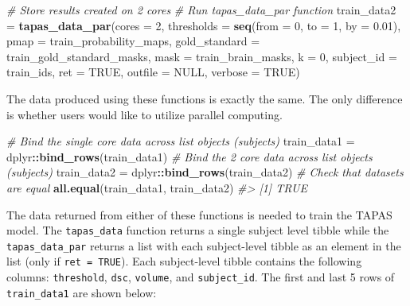 \documentclass[]{article}
\newenvironment{Shaded}{\begin{snugshade}}{\end{snugshade}}
\newcommand{\CommentTok}[1]{\textcolor[rgb]{0.56,0.35,0.01}{\textit{#1}}}
\newcommand{\DataTypeTok}[1]{\textcolor[rgb]{0.13,0.29,0.53}{#1}}
\newcommand{\DecValTok}[1]{\textcolor[rgb]{0.00,0.00,0.81}{#1}}
\newcommand{\FloatTok}[1]{\textcolor[rgb]{0.00,0.00,0.81}{#1}}
\newcommand{\KeywordTok}[1]{\textcolor[rgb]{0.13,0.29,0.53}{\textbf{#1}}}
\newcommand{\NormalTok}[1]{#1}
\newcommand{\OperatorTok}[1]{\textcolor[rgb]{0.81,0.36,0.00}{\textbf{#1}}}
\newcommand{\OtherTok}[1]{\textcolor[rgb]{0.56,0.35,0.01}{#1}}
\newcommand{\StringTok}[1]{\textcolor[rgb]{0.31,0.60,0.02}{#1}}
\begin{document}
\begin{Shaded}
\begin{Highlighting}[]
\CommentTok{# Store results created on 2 cores}
\CommentTok{# Run tapas_data_par function}
\NormalTok{train_data2 =}\StringTok{ }\KeywordTok{tapas_data_par}\NormalTok{(}\DataTypeTok{cores =} \DecValTok{2}\NormalTok{, }
                             \DataTypeTok{thresholds =} \KeywordTok{seq}\NormalTok{(}\DataTypeTok{from =} \DecValTok{0}\NormalTok{, }\DataTypeTok{to =} \DecValTok{1}\NormalTok{, }\DataTypeTok{by =} \FloatTok{0.01}\NormalTok{), }
                             \DataTypeTok{pmap =}\NormalTok{ train_probability_maps, }
                             \DataTypeTok{gold_standard =}\NormalTok{ train_gold_standard_masks, }
                             \DataTypeTok{mask =}\NormalTok{ train_brain_masks, }
                             \DataTypeTok{k =} \DecValTok{0}\NormalTok{, }
                             \DataTypeTok{subject_id =}\NormalTok{ train_ids,}
                             \DataTypeTok{ret =} \OtherTok{TRUE}\NormalTok{, }
                             \DataTypeTok{outfile =} \OtherTok{NULL}\NormalTok{, }
                             \DataTypeTok{verbose =} \OtherTok{TRUE}\NormalTok{)}
\end{Highlighting}
\end{Shaded}

The data produced using these functions is exactly the same. The only
difference is whether users would like to utilize parallel computing.

\begin{Shaded}
\begin{Highlighting}[]
\CommentTok{# Bind the single core data across list objects (subjects)}
\NormalTok{train_data1 =}\StringTok{ }\NormalTok{dplyr}\OperatorTok{::}\KeywordTok{bind_rows}\NormalTok{(train_data1)}
\CommentTok{# Bind the 2 core data across list objects (subjects)}
\NormalTok{train_data2 =}\StringTok{ }\NormalTok{dplyr}\OperatorTok{::}\KeywordTok{bind_rows}\NormalTok{(train_data2)}
\CommentTok{# Check that datasets are equal}
\KeywordTok{all.equal}\NormalTok{(train_data1, train_data2)}
\CommentTok{#> [1] TRUE}
\end{Highlighting}
\end{Shaded}

The data returned from either of these functions is needed to train the
TAPAS model. The \texttt{tapas\_data} function returns a single subject
level tibble while the \texttt{tapas\_data\_par} returns a list with
each subject-level tibble as an element in the list (only if
\texttt{ret\ =\ TRUE}). Each subject-level tibble contains the following
columns: \texttt{threshold}, \texttt{dsc}, \texttt{volume}, and
\texttt{subject\_id}. The first and last 5 rows of \texttt{train\_data1}
are shown below:
\end{document}

